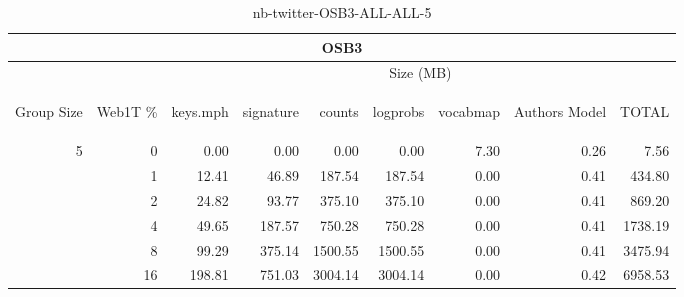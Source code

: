 \begin{center}
\begin{table}[htbp]
\begin{tabular}{ | r | r | r | r | r | r | r | r | r |}
\hline
\multicolumn{9}{|c|}{OSB3}\\
\hline
 & & \multicolumn{7}{|c|}{Size (MB)}\\ \cline{3-9}
\begin{sideways}Group Size\end{sideways} & \begin{sideways}Web1T \% \end{sideways} & \begin{sideways}keys.mph\end{sideways} & \begin{sideways}signature\end{sideways} & \begin{sideways}counts\end{sideways} & \begin{sideways}logprobs\end{sideways} & \begin{sideways}vocabmap\end{sideways} & \begin{sideways}Authors Model \end{sideways} & \begin{sideways}TOTAL\end{sideways}\\
\hline
\multirow{5}{*}{5}
 & 0 & 0.00 & 0.00 & 0.00 & 0.00 & 7.30 & 0.26 & 7.56\\ \cline{2-9}
 & 1 & 12.41 & 46.89 & 187.54 & 187.54 & 0.00 & 0.41 & 434.80\\ \cline{2-9}
 & 2 & 24.82 & 93.77 & 375.10 & 375.10 & 0.00 & 0.41 & 869.20\\ \cline{2-9}
 & 4 & 49.65 & 187.57 & 750.28 & 750.28 & 0.00 & 0.41 & 1738.19\\ \cline{2-9}
 & 8 & 99.29 & 375.14 & 1500.55 & 1500.55 & 0.00 & 0.41 & 3475.94\\ \cline{2-9}
 & 16 & 198.81 & 751.03 & 3004.14 & 3004.14 & 0.00 & 0.42 & 6958.53\\ \cline{2-9}
\hline
\end{tabular}
\caption{nb-twitter-OSB3-ALL-ALL-5}
\label{table:nb-twitter-OSB3-ALL-ALL-5}
\end{table}
\end{center}


